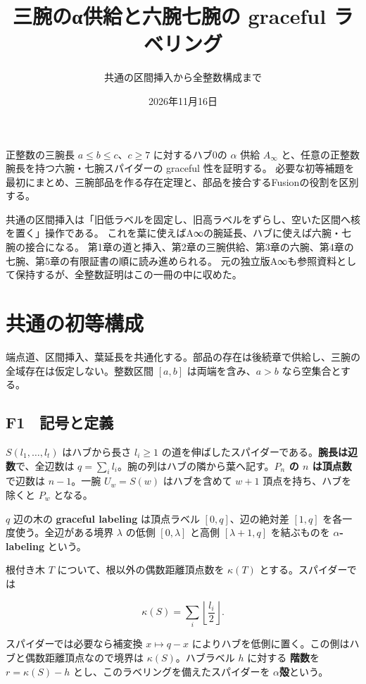 \documentclass[
  10pt,
  a4paper,
]{article}
\title{三腕のα供給と六腕七腕の graceful ラベリング}
\subtitle{共通の区間挿入から全整数構成まで}
\author{}
\date{2026年11月16日}
\begin{document}
\maketitle

{
\setcounter{tocdepth}{2}
\tableofcontents
}
正整数の三腕長 \(a\le b\le c\)、\(c\ge7\) に対するハブ0の \(\alpha\)
供給 \(A_\infty\) と、任意の正整数腕長を持つ六腕・七腕スパイダーの
graceful 性を証明する。
必要な初等補題を最初にまとめ、三腕部品を作る存在定理と、部品を接合するFusionの役割を区別する。

共通の区間挿入は「旧低ラベルを固定し、旧高ラベルをずらし、空いた区間へ核を置く」操作である。
これを葉に使えばA∞の腕延長、ハブに使えば六腕・七腕の接合になる。
第1章の道と挿入、第2章の三腕供給、第3章の六腕、第4章の七腕、第5章の有限証書の順に読み進められる。
元の独立版A∞も参照資料として保持するが、全整数証明はこの一冊の中に収めた。

\section{共通の初等構成}\label{ux5171ux901aux306eux521dux7b49ux69cbux6210}

端点道、区間挿入、葉延長を共通化する。部品の存在は後続章で供給し、三腕の全域存在は仮定しない。整数区間
\([a,b]\) は両端を含み、\(a>b\) なら空集合とする。

\subsection{F1　記号と定義}\label{f1-ux8a18ux53f7ux3068ux5b9aux7fa9}

\(S(l_1,\ldots,l_t)\) はハブから長さ \(l_i\ge1\)
の道を伸ばしたスパイダーである。\textbf{腕長は辺数}で、全辺数は
\(q=\sum_i l_i\)。腕の列はハブの隣から葉へ記す。\textbf{\(P_n\) の \(n\)
は頂点数}で辺数は \(n-1\)。一腕 \(U_w=S(w)\) はハブを含めて \(w+1\)
頂点を持ち、ハブを除くと \(P_w\) となる。

\(q\) 辺の木の \textbf{graceful labeling} は頂点ラベル
\([0,q]\)、辺の絶対差 \([1,q]\) を各一度使う。全辺がある境界 \(\lambda\)
の低側 \([0,\lambda]\) と高側 \([\lambda+1,q]\) を結ぶものを
\textbf{\(\alpha\)-labeling} という。

根付き木 \(T\) について、根以外の偶数距離頂点数を \(\kappa(T)\)
とする。スパイダーでは

\[
\kappa(S)=\sum_i\left\lfloor\frac{l_i}{2}\right\rfloor.
\]

スパイダーでは必要なら補変換 \(x\mapsto q-x\)
によりハブを低側に置く。この側はハブと偶数距離頂点なので境界は
\(\kappa(S)\)。ハブラベル \(h\) に対する \textbf{階数}を
\(r=\kappa(S)-h\) とし、このラベリングを備えたスパイダーを
\textbf{\(\alpha\)殻}という。
\end{document}
